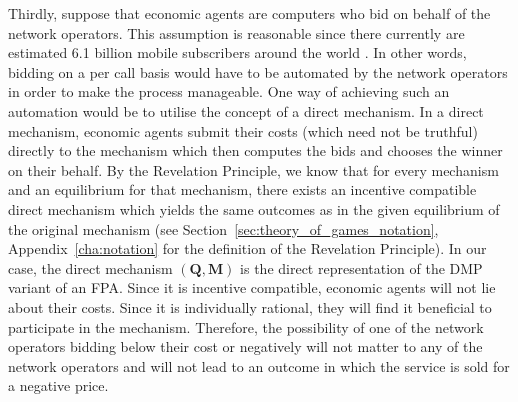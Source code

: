 Thirdly, suppose that economic agents are computers who bid on behalf of the network operators. This assumption is reasonable since there currently are estimated 6.1 billion mobile subscribers around the world \cite{Ericsson2011}. In other words, bidding on a per call basis would have to be automated by the network operators in order to make the process manageable. One way of achieving such an automation would be to utilise the concept of a direct mechanism. In a direct mechanism, economic agents submit their costs (which need not be truthful) directly to the mechanism which then computes the bids and chooses the winner on their behalf. By the Revelation Principle, we know that for every mechanism and an equilibrium for that mechanism, there exists an incentive compatible direct mechanism which yields the same outcomes as in the given equilibrium of the original mechanism (see Section~\ref{sec:theory_of_games_notation}, Appendix~\ref{cha:notation} for the definition of the Revelation Principle). In our case, the direct mechanism $(\mathbf{Q},\mathbf{M})$ is the direct representation of the DMP variant of an FPA. Since it is incentive compatible, economic agents will not lie about their costs. Since it is individually rational, they will find it beneficial to participate in the mechanism. Therefore, the possibility of one of the network operators bidding below their cost or negatively will not matter to any of the network operators and will not lead to an outcome in which the service is sold for a negative price.

